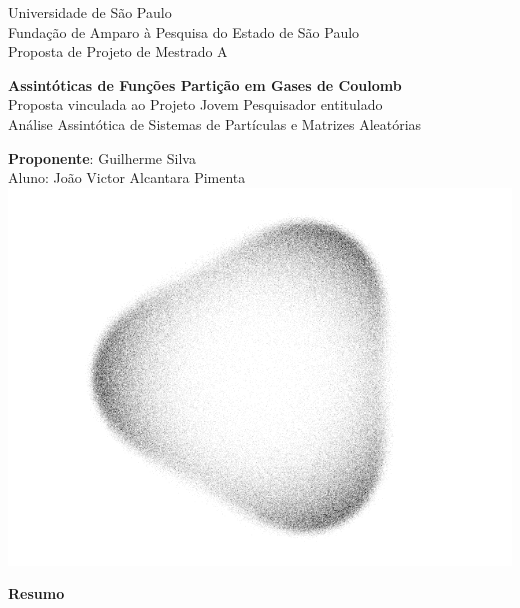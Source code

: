 \documentclass[12pt,a4paper]{article}
\numberwithin{equation}{section} %
\begin{document}
\doublespacing

\begin{titlepage}
    \begin{center}
        {\large \sc Universidade de São Paulo} \\
        {\large \sc Fundação de Amparo à Pesquisa do Estado de São Paulo}\\
        {\large \sc Proposta de Projeto de Mestrado A}
        
        \vspace{1cm}

        {\Large \bfseries Assintóticas de Funções Partição em Gases de Coulomb} \\
        \vspace{1cm}
		{\small \sc Proposta vinculada ao Projeto Jovem Pesquisador entitulado} \\
		{\small \sc Análise Assintótica de Sistemas de Partículas e Matrizes Aleatórias} \\
		\vspace{1cm}

        {\small \sc \textbf{Proponente}: Guilherme Silva}\\
        {\small \sc Aluno: João Victor Alcantara Pimenta}\\[0.5cm]
        
        \includegraphics[scale=0.30]{Assets/CuteCircleWhite2}
        
    \end{center}

    \vfill

    \begin{center}
        {\bf \large Resumo} \\[1em]
    \end{center}
    

    
\end{titlepage}
\end{document}
